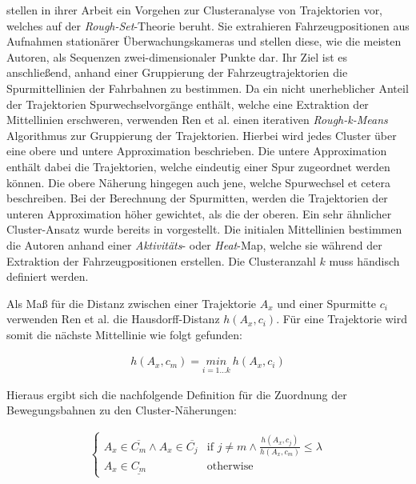 \cite[]{Ren2014} stellen in ihrer Arbeit ein Vorgehen zur Clusteranalyse von Trajektorien vor,
welches auf der \textit{Rough-Set}-Theorie beruht. Sie extrahieren Fahrzeugpositionen aus Aufnahmen stationärer
Überwachungskameras und stellen diese, wie die meisten Autoren, als Sequenzen zwei-dimensionaler
Punkte dar. Ihr Ziel ist es anschließend, anhand einer Gruppierung der Fahrzeugtrajektorien
die Spurmittellinien der Fahrbahnen zu bestimmen. Da ein nicht unerheblicher Anteil der Trajektorien Spurwechselvorgänge
enthält, welche eine Extraktion der Mittellinien erschweren, verwenden Ren et al. einen iterativen \textit{Rough-k-Means}
Algorithmus zur Gruppierung der Trajektorien. Hierbei wird jedes Cluster über eine obere und untere Approximation beschrieben.
Die untere Approximation enthält dabei die Trajektorien, welche eindeutig einer Spur zugeordnet werden können.
Die obere Näherung hingegen auch jene, welche Spurwechsel et cetera beschreiben. Bei der Berechnung der Spurmitten, werden
die Trajektorien der unteren Approximation höher gewichtet, als die der oberen. Ein sehr ähnlicher Cluster-Ansatz wurde
bereits in \cite[]{Lingras2004} vorgestellt.
Die initialen Mittellinien bestimmen die Autoren anhand einer \textit{Aktivitäts}- oder \textit{Heat}-Map,
welche sie während der Extraktion der Fahrzeugpositionen erstellen. Die Clusteranzahl $k$ muss händisch definiert werden.

Als Maß für die Distanz zwischen einer Trajektorie $A_x$ und einer Spurmitte $c_i$ verwenden Ren et al. die
Hausdorff-Distanz $h(A_x, c_i)$. Für eine Trajektorie wird somit die nächste Mittellinie wie folgt gefunden:

\begin{ceqn}
\begin{align}
    h(A_x, c_m) = \underset{i = 1 ... k}{min}\ h(A_x, c_i)
\end{align}
\end{ceqn}

Hieraus ergibt sich die nachfolgende Definition für die Zuordnung der Bewegungsbahnen zu den Cluster-Näherungen:

\begin{ceqn}
\begin{align}
    \begin{cases}
        A_x \in \overline{C_m} \land A_x \in \overline{C_j} & \text{if } j \neq m \land \frac{h(A_x, c_j)}{h(A_x, c_m)} \leq \lambda \\
        A_x \in \underline{C_m} & \text{otherwise}
    \end{cases}
\end{align}
\end{ceqn}

